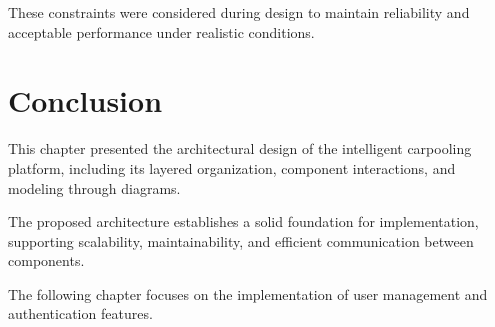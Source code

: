 These constraints were considered during design to maintain reliability and acceptable performance under realistic conditions.

\section{Conclusion}

This chapter presented the architectural design of the intelligent carpooling platform, including its layered organization, component interactions, and modeling through diagrams.

The proposed architecture establishes a solid foundation for implementation, supporting scalability, maintainability, and efficient communication between components.

The following chapter focuses on the implementation of user management and authentication features.